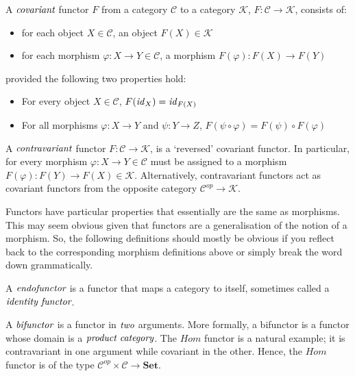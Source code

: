 \begin{defn}
 A $\emph{covariant}$ functor $F$ from a category $\mathcal{C}$ to a category $\mathcal{K}$, $F: \mathcal{C} \to \mathcal{K}$, consists of:
 \begin{itemize}
  \item for each object $X \in \mathcal{C}$, an object $F(X) \in \mathcal{K}$
  \item for each morphism $\varphi: X \to Y \in \mathcal{C}$, a morphism $F(\varphi): F(X) \to F(Y)$
 \end{itemize}
 provided the following two properties hold:
 \begin{itemize}
  \item For every object $X \in \mathcal{C}$, $F(\mathit{id}_{X}) = \mathit{id}_{F(X)}$
  \item For all morphisms $\varphi: X \to Y$ and $\psi: Y \to Z$, $F(\psi \circ \varphi) = F(\psi) \circ F(\varphi)$
 \end{itemize}
\end{defn}

\begin{defn}
 A $\emph{contravariant}$ functor $F: \mathcal{C} \to \mathcal{K}$, is a `reversed' covariant functor.
 In particular, for every morphism $\varphi: X \to Y \in \mathcal{C}$ must be assigned to a morphism $F(\varphi): F(Y) \to F(X) \in \mathcal{K}$.
 Alternatively, contravariant functors act as covariant functors from the opposite category $\mathcal{C}^{op} \to \mathcal{K}$.
\end{defn}

Functors have particular properties that essentially are the same as morphisms.
This may seem obvious given that functors are a generalisation of the notion of a morphism.
So, the following definitions should mostly be obvious if you reflect back to the corresponding morphism
definitions above or simply break the word down grammatically.

\begin{defn}[Endofunctor]
 A $\emph{endofunctor}$ is a functor that maps a category to itself, sometimes called a $\emph{identity functor}$.
\end{defn}

\begin{defn}[Bifunctor]
 A $\emph{bifunctor}$ is a functor in $\emph{two}$ arguments. More formally, a bifunctor is a functor whose
 domain is a $\emph{product category}$.
 The $Hom$ functor is a natural example; it is contravariant in one argument while covariant in the other.
 Hence, the $Hom$ functor is of the type $\mathcal{C}^{op} \times \mathcal{C} \to \textbf{Set}$.
\end{defn}

